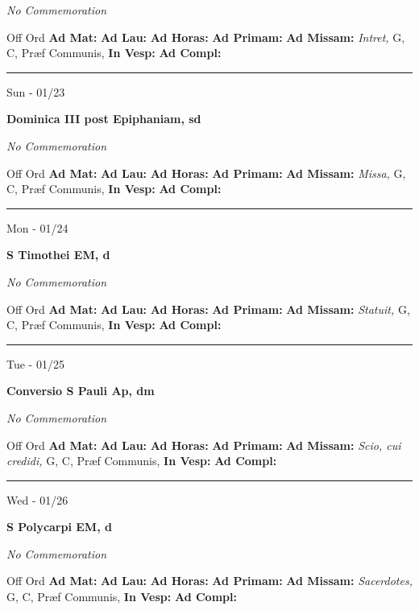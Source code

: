 \documentclass[letterpaper, 10pt]{article}
\begin{document}
\textit{No Commemoration}\begin{justify}
Off Ord
\textbf{Ad Mat: }
\textbf{Ad Lau: }
\textbf{Ad Horas: }
\textbf{Ad Primam: }
\textbf{Ad Missam:} \textit{Intret, } G, C, Præf Communis, 
\textbf{In Vesp: }
\textbf{Ad Compl: }\end{justify}



\hrule
\begin{center}
Sun - 01/23
\end{center}\textbf{ \large Dominica III post Epiphaniam, \textnormal{\normalsize sd}}

\textit{No Commemoration}\begin{justify}
Off Ord
\textbf{Ad Mat: }
\textbf{Ad Lau: }
\textbf{Ad Horas: }
\textbf{Ad Primam: }
\textbf{Ad Missam:} \textit{Missa, } G, C, Præf Communis, 
\textbf{In Vesp: }
\textbf{Ad Compl: }\end{justify}



\hrule
\begin{center}
Mon - 01/24
\end{center}\textbf{ \large S Timothei EM, \textnormal{\normalsize d}}

\textit{No Commemoration}\begin{justify}
Off Ord
\textbf{Ad Mat: }
\textbf{Ad Lau: }
\textbf{Ad Horas: }
\textbf{Ad Primam: }
\textbf{Ad Missam:} \textit{Statuit, } G, C, Præf Communis, 
\textbf{In Vesp: }
\textbf{Ad Compl: }\end{justify}



\hrule
\begin{center}
Tue - 01/25
\end{center}\textbf{ \large Conversio S Pauli Ap, \textnormal{\normalsize dm}}

\textit{No Commemoration}\begin{justify}
Off Ord
\textbf{Ad Mat: }
\textbf{Ad Lau: }
\textbf{Ad Horas: }
\textbf{Ad Primam: }
\textbf{Ad Missam:} \textit{Scio, cui credidi, } G, C, Præf Communis, 
\textbf{In Vesp: }
\textbf{Ad Compl: }\end{justify}



\hrule
\begin{center}
Wed - 01/26
\end{center}\textbf{ \large S Polycarpi EM, \textnormal{\normalsize d}}

\textit{No Commemoration}\begin{justify}
Off Ord
\textbf{Ad Mat: }
\textbf{Ad Lau: }
\textbf{Ad Horas: }
\textbf{Ad Primam: }
\textbf{Ad Missam:} \textit{Sacerdotes, } G, C, Præf Communis, 
\textbf{In Vesp: }
\textbf{Ad Compl: }\end{justify}
\end{document}
